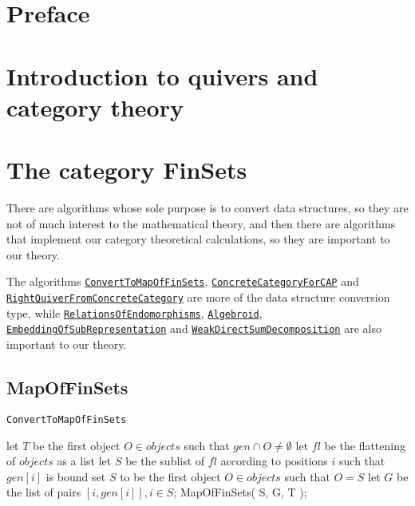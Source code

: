 \documentclass{article}
\begin{document}
\tableofcontents\label{toc}
\section{Preface}
\section{Introduction to quivers and category theory}
\section{The category FinSets}

There are algorithms whose sole purpose is to convert data structures, so they are not of much interest to the mathematical theory,
and then there are algorithms that implement our category theoretical calculations, so they are important to our theory.

The algorithms \hyperref[func:ConvertToMapOfFinSets]{\texttt{ConvertToMapOfFinSets}}, 
\hyperref[func:ConcreteCategoryForCAP]{\texttt{ConcreteCategoryForCAP}} and 
\hyperref[func:RightQuiverFromConcreteCategory]{\texttt{RightQuiverFromConcreteCategory}} are
more of the data structure conversion type, while 
\hyperref[func:RelationsOfEndomorphisms]{\texttt{RelationsOfEndomorphisms}}, 
\hyperref[func:Algebroid]{\texttt{Algebroid}},
\hyperref[func:EmbeddingOfSubRepresentation]{\texttt{EmbeddingOfSubRepresentation}} and 
\hyperref[func:WeakDirectSumDecomposition]{\texttt{WeakDirectSumDecomposition}} are also important to our theory.

\subsection{MapOfFinSets}

\begin{algorithm}\capstart
   \caption{\texttt{ConvertToMapOfFinSets}}\label{algo:ConvertToMapOfFinSets}
      \BlankLine
      let $T$ be the first object $O \in objects$ such that $gen \cap O \not= \emptyset$\;
      let $fl$ be the flattening of $objects$ as a list\;
      let $S$ be the sublist of $fl$ according to positions $i$ such that $gen[i]$ is bound\;
      set $S$ to be the first object $O \in objects$ such that $O = S$\;
      \BlankLine
      let $G$ be the list of pairs $[ i, gen[i] ], i \in S$;
      \BlankLine
      \Return MapOfFinSets( S, G, T );
\end{algorithm}
\end{document}
